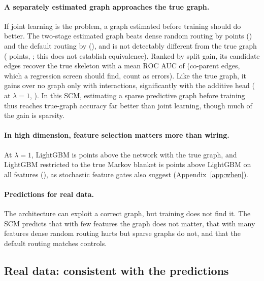 \documentclass[anon,12pt]{clear2027} %
\begin{document}
\paragraph{A separately estimated graph approaches the true graph.}
If joint learning is the problem, a graph estimated before training should do better. The two-stage estimated graph beats dense random routing by \SynHighEstRandAbs{} points (\SynHighEstRandPe{}) and the default routing by \SynHighEstLearnAbs{} (\SynHighEstLearnPe{}), and is not detectably different from the true graph (\SynHighTrueEst{} points, \SynHighTrueEstPe{}; this does not establish equivalence). Ranked by split gain, its candidate edges recover the true skeleton with a mean ROC AUC of \SynEstAucSkel{} (co-parent edges, which a regression screen should find, count as errors). Like the true graph, it gains over no graph only with interactions, significantly with the additive head (\SynHighAddEstNoneLamOne{} at $\lambda=1$, \SynHighAddEstNoneLamOnePe{}). In this SCM, estimating a sparse predictive graph before training thus reaches true-graph accuracy far better than joint learning, though much of the gain is sparsity.

\paragraph{In high dimension, feature selection matters more than wiring.}
At $\lambda=1$, LightGBM is \SynHighLgbTrueLamOneAbs{} points above the network with the true graph, and LightGBM restricted to the true Markov blanket is \SynHighMbLgbLamOneAbs{} points above LightGBM on all features (\SynHighMbLgbLamOnePe{}), as stochastic feature gates \citep{yamada2020feature} also suggest (Appendix~\ref{app:when}).

\paragraph{Predictions for real data.} The architecture can exploit a correct graph, but training does not find it. The SCM predicts that with few features the graph does not matter, that with many features dense random routing hurts but sparse graphs do not, and that the default routing matches controls.

\subsection{Real data: consistent with the predictions}
\label{sec:when-real}
\end{document}
